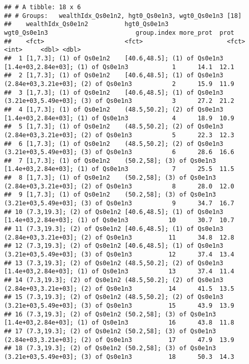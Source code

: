 \documentclass[
]{book}
\begin{document}
\begin{verbatim}
## # A tibble: 18 x 6
## # Groups:   wealthIdx_Qs0e1n2, hgt0_Qs0e1n3, wgt0_Qs0e1n3 [18]
##    wealthIdx_Qs0e1n2          hgt0_Qs0e1n3                wgt0_Qs0e1n3                        group.index more_prot  prot
##    <fct>                      <fct>                       <fct>                                     <int>     <dbl> <dbl>
##  1 [1,7.3]; (1) of Qs0e1n2    [40.6,48.5]; (1) of Qs0e1n3 [1.4e+03,2.84e+03]; (1) of Qs0e1n3            1      14.1  12.1
##  2 [1,7.3]; (1) of Qs0e1n2    [40.6,48.5]; (1) of Qs0e1n3 (2.84e+03,3.21e+03]; (2) of Qs0e1n3           2      15.9  11.9
##  3 [1,7.3]; (1) of Qs0e1n2    [40.6,48.5]; (1) of Qs0e1n3 (3.21e+03,5.49e+03]; (3) of Qs0e1n3           3      27.2  21.2
##  4 [1,7.3]; (1) of Qs0e1n2    (48.5,50.2]; (2) of Qs0e1n3 [1.4e+03,2.84e+03]; (1) of Qs0e1n3            4      18.9  10.9
##  5 [1,7.3]; (1) of Qs0e1n2    (48.5,50.2]; (2) of Qs0e1n3 (2.84e+03,3.21e+03]; (2) of Qs0e1n3           5      22.3  12.3
##  6 [1,7.3]; (1) of Qs0e1n2    (48.5,50.2]; (2) of Qs0e1n3 (3.21e+03,5.49e+03]; (3) of Qs0e1n3           6      28.6  16.6
##  7 [1,7.3]; (1) of Qs0e1n2    (50.2,58]; (3) of Qs0e1n3   [1.4e+03,2.84e+03]; (1) of Qs0e1n3            7      25.5  11.5
##  8 [1,7.3]; (1) of Qs0e1n2    (50.2,58]; (3) of Qs0e1n3   (2.84e+03,3.21e+03]; (2) of Qs0e1n3           8      28.0  12.0
##  9 [1,7.3]; (1) of Qs0e1n2    (50.2,58]; (3) of Qs0e1n3   (3.21e+03,5.49e+03]; (3) of Qs0e1n3           9      34.7  16.7
## 10 (7.3,19.3]; (2) of Qs0e1n2 [40.6,48.5]; (1) of Qs0e1n3 [1.4e+03,2.84e+03]; (1) of Qs0e1n3           10      30.7  10.7
## 11 (7.3,19.3]; (2) of Qs0e1n2 [40.6,48.5]; (1) of Qs0e1n3 (2.84e+03,3.21e+03]; (2) of Qs0e1n3          11      34.8  12.8
## 12 (7.3,19.3]; (2) of Qs0e1n2 [40.6,48.5]; (1) of Qs0e1n3 (3.21e+03,5.49e+03]; (3) of Qs0e1n3          12      37.4  13.4
## 13 (7.3,19.3]; (2) of Qs0e1n2 (48.5,50.2]; (2) of Qs0e1n3 [1.4e+03,2.84e+03]; (1) of Qs0e1n3           13      37.4  11.4
## 14 (7.3,19.3]; (2) of Qs0e1n2 (48.5,50.2]; (2) of Qs0e1n3 (2.84e+03,3.21e+03]; (2) of Qs0e1n3          14      41.5  13.5
## 15 (7.3,19.3]; (2) of Qs0e1n2 (48.5,50.2]; (2) of Qs0e1n3 (3.21e+03,5.49e+03]; (3) of Qs0e1n3          15      43.9  13.9
## 16 (7.3,19.3]; (2) of Qs0e1n2 (50.2,58]; (3) of Qs0e1n3   [1.4e+03,2.84e+03]; (1) of Qs0e1n3           16      43.8  11.8
## 17 (7.3,19.3]; (2) of Qs0e1n2 (50.2,58]; (3) of Qs0e1n3   (2.84e+03,3.21e+03]; (2) of Qs0e1n3          17      47.9  13.9
## 18 (7.3,19.3]; (2) of Qs0e1n2 (50.2,58]; (3) of Qs0e1n3   (3.21e+03,5.49e+03]; (3) of Qs0e1n3          18      50.3  14.3
\end{verbatim}
\end{document}
